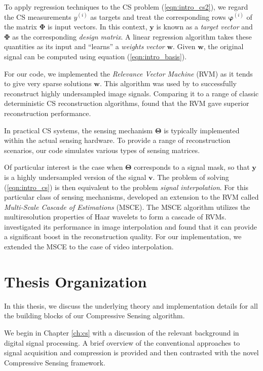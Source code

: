 To apply regression techniques to the CS problem (\ref{eqn:intro_cs2}), we regard the CS measurements $y^{(i)}$ as targets and treat the corresponding rows $\bm\varphi^{(i)}$ of the matrix $\bm\Phi$ is input vectors.
In this context, $\bm y$ is known as a \emph{target vector} and $\bm\Phi$ as the corresponding \emph{design matrix}.
A linear regression algorithm takes these quantities as its input and ``learns'' a \emph{weights vector} $\bm w$.
Given $\bm w$, the original signal can be computed using equation (\ref{eqn:intro_basis}).

For our code, we implemented the \emph{Relevance Vector Machine} (RVM) \cite{tipping2001,tipping2003} as it tends to give very sparse solutions $\bm w$.
This algorithm was used by \cite{pilikos2014} to successfully reconstruct highly undersampled image signals.
Comparing it to a range of classic deterministic CS reconstruction algorithms, \cite{pilikos2014} found that the RVM gave superior reconstruction performance.

In practical CS systems, the sensing mechanism $\bm\Theta$ is typically implemented within the actual sensing hardware.
To provide a range of reconstruction scenarios, our code simulates various types of sensing matrices.

Of particular interest is the case when $\bm\Theta$ corresponds to a signal mask, so that $\bm y$ is a highly undersampled version of the signal $\bm v$.
The problem of solving (\ref{eqn:intro_cs}) is then equivalent to the problem \emph{signal interpolation}.
For this particular class of sensing mechanisms, \cite{pilikos2014} developed an extension to the RVM called \emph{Multi-Scale Cascade of Estimations} (MSCE).
The MSCE algorithm utilizes the multiresolution properties of Haar wavelets to form a cascade of RVMs.
\cite{pilikos2014} investigated its performance in image interpolation and found that it can provide a significant boost in the reconstruction quality.
For our implementation, we extended the MSCE to the case of video interpolation.

\section*{Thesis Organization}
In this thesis, we discuss the underlying theory and implementation details for all the building blocks of our Compressive Sensing algorithm.

We begin in Chapter \ref{ch:cs} with a discussion of the relevant background in digital signal processing.
A brief overview of the conventional approaches to signal acquisition and compression is provided and then contrasted with the novel Compressive Sensing framework.

